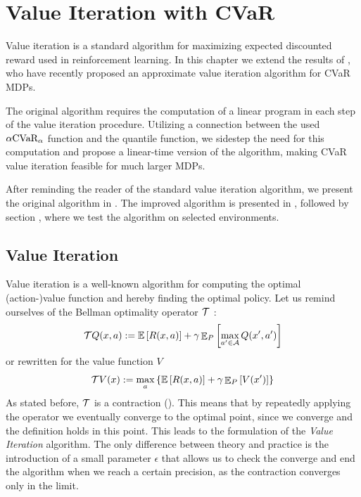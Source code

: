 \chapter{Value Iteration with CVaR}\label{ch:vi}

Value iteration is a standard algorithm for maximizing expected discounted reward used in reinforcement learning. In this chapter we extend the results of \citet{chow2015risk}, who have recently proposed an approximate value iteration algorithm for CVaR MDPs. 

The original algorithm requires the computation of a linear program in each step of the value iteration procedure. Utilizing a connection between the used $\alpha \text{CVaR}_\alpha$ function and the quantile function, we sidestep the need for this computation and propose a linear-time version of the algorithm, making CVaR value iteration feasible for much larger MDPs. 

After reminding the reader of the standard value iteration algorithm, we present the original algorithm in . The improved algorithm is presented in  , followed by section , where we test the algorithm on selected environments.


\section{Value Iteration}

Value iteration \citep{sutton1998reinforcement} is a well-known algorithm for computing the optimal (action-)value function and hereby finding the optimal policy. Let us remind ourselves of the Bellman optimality operator $\mathcal{T}$ :
\begin{equation*}
\mathcal{T} Q(x,a) := \mathbb{E}\left[ { R(x, a)} \right] + \gamma \mathop{\mathbb{E}}\nolimits_{P} \left[ {\max_{a' \in \mathcal{A}}Q(x', a')} \right]
\end{equation*}
or rewritten for the value function $V$
\begin{equation}
\mathcal{T} V(x) := \max_a\left\{ {\mathbb{E}\left[ { R(x, a)} \right] + \gamma \mathop{\mathbb{E}}\nolimits_{P} \left[ {V(x')} \right]} \right\}
\end{equation}
As stated before, $\mathcal{T}$ is a contraction (). This means that by repeatedly applying the operator we eventually converge to the optimal point, since we converge and the definition holds in this point. This leads to the formulation of the \textit{Value Iteration} algorithm. The only difference between theory and practice is the introduction of a small parameter $\epsilon$ that allows us to check the converge and end the algorithm when we reach a certain precision, as the contraction converges only in the limit.

